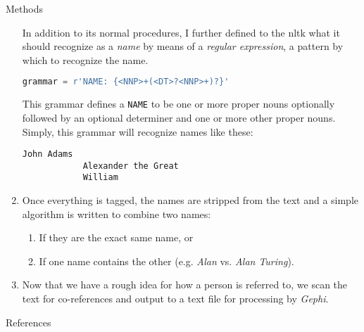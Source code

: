 \documentclass{beamer}
\newcommand{\Gephi}{\textit{Gephi}\xspace}
\begin{document}
\begin{frame}[t,fragile]{}
\begin{columns}
\begin{column}{.45\textwidth}
\begin{block}{Methods}
\begin{enumerate}
          In addition to its normal procedures, I further defined to the
          \ac{nltk} what it should recognize as a \emph{name} by means
          of a \emph{regular expression}, a pattern by which to
          recognize the name.
          \medskip
          \begin{lstlisting}[language=Python,
                             basicstyle=\ttfamily,
                             frame=shadowbox]
            grammar = r'NAME: {<NNP>+(<DT>?<NNP>+)?}'
          \end{lstlisting}
          This grammar defines a \texttt{NAME} to be one or more
          proper nouns optionally followed by an optional determiner
          and one or more other proper nouns.  Simply, this grammar
          will recognize names like these:
          \medskip
          \begin{lstlisting}[frame=shadowbox]
            John Adams
            Alexander the Great
            William
          \end{lstlisting}

        \item Once everything is tagged, the names are stripped from
          the text and a simple algorithm is written to combine two
          names:
          \begin{enumerate}
          \item If they are the exact same name, or
          \item If one name contains the other (e.g. \textsl{Alan}
            vs. \textsl{Alan Turing}).
          \end{enumerate}
        \item Now that we have a rough idea for how a person is
          referred to, we scan the text for co-references and output
          to a text file for processing by \Gephi.
        \end{enumerate}
      \end{block}
      \begin{block}{References}
        \centering
        \begin{minipage}{.9\linewidth}
          \printbibliography
        \end{minipage}
      \end{block}

    \end{column}


\end{columns}
\end{frame}
\end{document}
